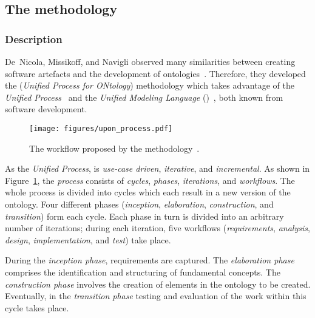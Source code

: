 \subsection{The  methodology}
\label{subsec:approach2}

\subsubsection{Description}

De~Nicola, Missikoff, and Navigli observed many similarities between creating software artefacts and the development of ontologies~\cite{SoftwareEngineeringOntology}. Therefore, they developed the  (\emph{Unified Process for ONtology}) methodology which takes advantage of the \emph{Unified Process}~\cite{UnifiedProcess} and the \emph{Unified Modeling Language} ()~\cite{UML}, both known from software development.

\begin{figure}
\centering
\texttt{[image: figures/upon\_process.pdf]}
\caption[The workflow proposed by ]{The workflow proposed by the  methodology~\cite{SoftwareEngineeringOntology}.}
\label{fig:upon_process}
\end{figure}

As the \emph{Unified Process},  is \emph{use-case driven}, \emph{iterative}, and \emph{incremental}. As shown in Figure~\ref{fig:upon_process}, the  \emph{process} consists of \emph{cycles}, \emph{phases}, \emph{iterations}, and \emph{workflows}. The whole process is divided into cycles which each result in a new version of the ontology. Four different phases (\emph{inception}, \emph{elaboration}, \emph{construction}, and \emph{transition}) form each cycle. Each phase in turn is divided into an arbitrary number of iterations; during each iteration, five workflows (\emph{requirements}, \emph{analysis}, \emph{design}, \emph{implementation}, and \emph{test}) take place.

During the \emph{inception phase}, requirements are captured. The \emph{elaboration phase} comprises the identification and structuring of fundamental concepts. The \emph{construction phase} involves the creation of elements in the ontology to be created. Eventually, in the \emph{transition phase} testing and evaluation of the work within this cycle takes place.

